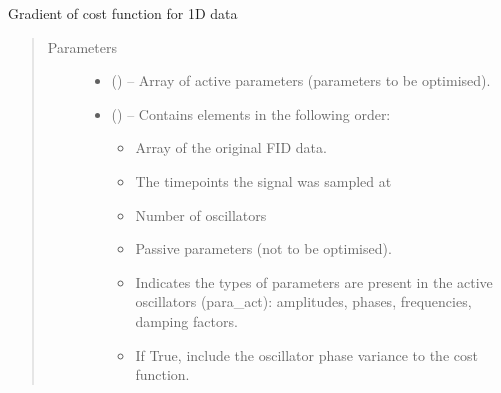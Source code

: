 \documentclass[letterpaper,10pt,english]{sphinxmanual}
\begin{document}
\begin{fulllineitems}
\label{\detokenize{references/nlp/_funcs:nmrespy.nlp._funcs.g_1d}}
\sphinxAtStartPar
Gradient of cost function for 1D data
\begin{quote}\begin{description}
\item[{Parameters}] \leavevmode\begin{itemize}
\item {} 
\sphinxAtStartPar
{} () – Array of active parameters (parameters to be optimised).

\item {} 
\sphinxAtStartPar
{} () – 
\sphinxAtStartPar
Contains elements in the following order:
\begin{itemize}
\item {} 
\sphinxAtStartPar
{}  Array of the original FID data.

\item {} 
\sphinxAtStartPar
{}  The time\sphinxhyphen{}points the signal was sampled at

\item {} 
\sphinxAtStartPar
{}  Number of oscillators

\item {} 
\sphinxAtStartPar
{}  Passive parameters (not to be
optimised).

\item {} 
\sphinxAtStartPar
{}  Indicates the types of parameters are present
in the active oscillators (para\_act):  \sphinxhyphen{} amplitudes,  \sphinxhyphen{}
phases,  \sphinxhyphen{} frequencies,  \sphinxhyphen{} damping factors.

\item {} 
\sphinxAtStartPar
{}  If True, include the oscillator phase
variance to the cost function.


\end{itemize}
\end{itemize}
\end{description}
\end{quote}
\end{fulllineitems}
\end{document}
